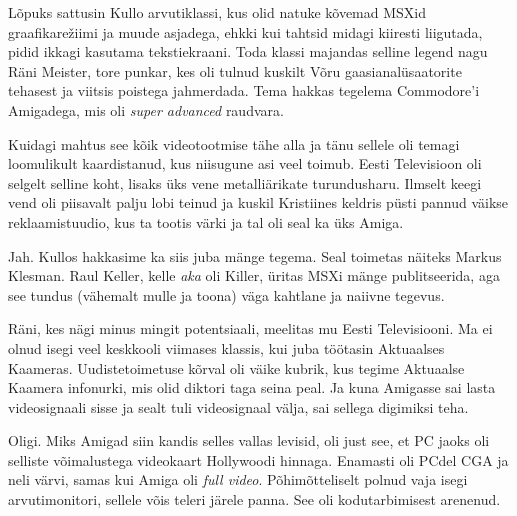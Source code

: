 Lõpuks sattusin Kullo 
arvutiklassi, kus olid natuke kõvemad MSXid graafikarežiimi ja muude asjadega, ehkki kui 
tahtsid midagi kiiresti liigutada, pidid ikkagi kasutama tekstiekraani. Toda 
klassi majandas selline legend nagu Räni Meister, 
tore punkar, kes oli tulnud kuskilt Võru 
gaasianalüsaatorite tehasest ja viitsis poistega jahmerdada. Tema 
hakkas tegelema Commodore'i 
Amigadega, mis oli 
\emph{super advanced} raudvara. 

Kuidagi mahtus see kõik videotootmise tähe alla ja tänu 
sellele oli temagi loomulikult kaardistanud, kus niisugune asi veel toimub. 
Eesti Televisioon oli selgelt 
selline koht, lisaks üks vene metalliärikate turundusharu. Ilmselt keegi 
vend oli piisavalt palju lobi teinud ja kuskil Kristiines keldris püsti 
pannud väikse reklaamistuudio, kus ta tootis värki ja tal oli 
seal ka üks Amiga. 


Jah. Kullos hakkasime ka siis juba mänge tegema. Seal toimetas näiteks Markus 
Klesman. Raul 
Keller, kelle \emph{aka} oli 
Killer, üritas MSXi mänge 
publitseerida, aga see tundus (vähemalt mulle ja toona) väga 
kahtlane ja naiivne tegevus.

Räni, kes nägi minus mingit potentsiaali, 
meelitas mu Eesti Televisiooni. Ma ei olnud isegi veel keskkooli viimases klassis, 
kui juba töötasin Aktuaalses Kaameras. Uudistetoimetuse kõrval oli 
väike kubrik, kus tegime Aktuaalse Kaamera infonurki, mis olid diktori 
taga seina peal. Ja kuna Amigasse 
sai lasta videosignaali sisse ja sealt tuli videosignaal välja, sai 
sellega digimiksi teha. 


Oligi. Miks Amigad siin kandis selles vallas levisid, oli just see, et PC 
jaoks oli selliste võimalustega videokaart Hollywoodi hinnaga. Enamasti oli 
PCdel 
CGA ja neli värvi, samas kui 
Amiga oli \emph{full video}. Põhimõtteliselt polnud 
vaja isegi arvutimonitori, sellele võis teleri järele panna. See oli 
kodutarbimisest arenenud. 


